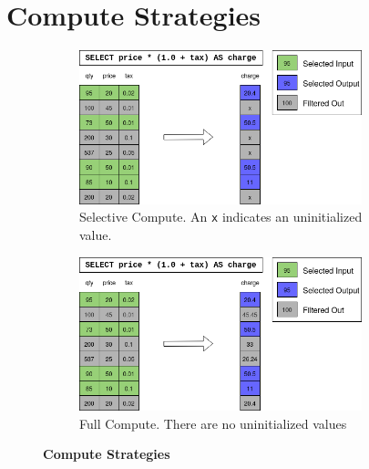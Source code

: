 \documentclass[12pt]{cmuthesis}
\begin{document}
\section{Compute Strategies}
\label{computestrategies}
\begin{figure}[t!]
\centering
\hspace*{\fill}%
\begin{subfigure}{.8\textwidth}
 \centering
 \includegraphics[width=0.9\textwidth]{images/SelectiveCompute.png}
 \caption{Selective Compute. An \texttt{x} indicates an uninitialized value.}
  \label{fig:compute_intro_selective}
\end{subfigure}%
\hspace*{\fill}%
\vspace*{8pt}%

\hspace*{\fill}%

\begin{subfigure}{.8\textwidth}
 \centering
 \includegraphics[width=0.9\textwidth]{images/FullComputeMap.png}
 \caption{Full Compute. There are no uninitialized values}
  \label{fig:compute_intro_full}
\end{subfigure}
\caption{\textbf{Compute Strategies}}
\label{fig:compute_intro}
\end{figure}
\end{document}

